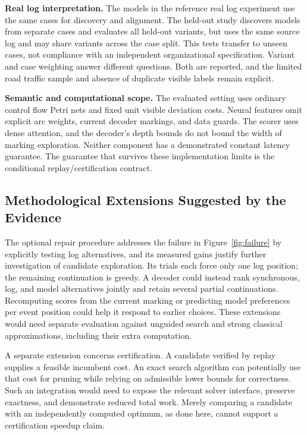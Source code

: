 \begin{revised}\textbf{Real log interpretation.} The models in the reference real log experiment use the same cases for discovery and alignment. The held-out study discovers models from separate cases and evaluates all held-out variants, but uses the same source log and may share variants across the case split. This tests transfer to unseen cases, not compliance with an independent organizational specification. Variant and case weighting answer different questions. Both are reported, and the limited road traffic sample and absence of duplicate visible labels remain explicit.\end{revised}

\textbf{Semantic and computational scope.} The evaluated setting uses ordinary control flow Petri nets and fixed unit visible deviation costs. Neural features omit explicit arc weights, current decoder markings, and data guards. The scorer uses dense attention, and the decoder's depth bounds do not bound the width of marking exploration. Neither component has a demonstrated constant latency guarantee. The guarantee that survives these implementation limits is the conditional replay/certification contract.

\subsection{Methodological Extensions Suggested by the Evidence}

\begin{revised}The optional repair procedure addresses the failure in Figure~\ref{fig:failure} by explicitly testing log alternatives, and its measured gains justify further investigation of candidate exploration. Its trials each force only one log position; the remaining continuation is greedy. A decoder could instead rank synchronous, log, and model alternatives jointly and retain several partial continuations. Recomputing scores from the current marking or predicting model preferences per event position could help it respond to earlier choices. These extensions would need separate evaluation against unguided search and strong classical approximations, including their extra computation.\end{revised}

A separate extension concerns certification. A candidate verified by replay supplies a feasible incumbent cost. An exact search algorithm can potentially use that cost for pruning while relying on admissible lower bounds for correctness. Such an integration would need to expose the relevant solver interface, preserve exactness, and demonstrate reduced total work. Merely comparing a candidate with an independently computed optimum, as done here, cannot support a certification speedup claim.

